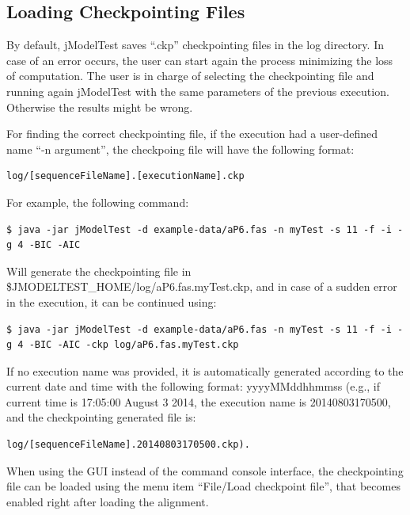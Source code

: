 \documentclass[10pt,twoside,a4paper]{article}
\begin{document}
\subsection{Loading Checkpointing Files}
\label{sec:ckp}

By default, jModelTest saves ``.ckp'' checkpointing files in the log directory. In case of an error occurs, the user can start again the process minimizing the loss of computation. The user is in charge of selecting the checkpointing file and running again jModelTest with the same parameters of the previous execution. Otherwise the results might be wrong.

For finding the correct checkpointing file, if the execution had a user-defined name ``-n argument'', the checkpoing file will have the following format: 

\begin{lstlisting}
log/[sequenceFileName].[executionName].ckp
\end{lstlisting}

For example, the following command:

\begin{lstlisting}
$ java -jar jModelTest -d example-data/aP6.fas -n myTest -s 11 -f -i -g 4 -BIC -AIC
\end{lstlisting}

Will generate the checkpointing file in \$JMODELTEST\_HOME/log/aP6.fas.myTest.ckp, and in case of a sudden error in the execution, it can be continued using:

\begin{lstlisting}
$ java -jar jModelTest -d example-data/aP6.fas -n myTest -s 11 -f -i -g 4 -BIC -AIC -ckp log/aP6.fas.myTest.ckp
\end{lstlisting}

If no execution name was provided, it is automatically generated according to the current date and time with the following format: yyyyMMddhhmmss (e.g., if current time is 17:05:00 August 3 2014, the execution name is 20140803170500, and the checkpointing generated file is:

\begin{lstlisting}
log/[sequenceFileName].20140803170500.ckp).
\end{lstlisting}

When using the GUI instead of the command console interface, the checkpointing file can be loaded using the menu item ``File/Load checkpoint file'', that becomes enabled right after loading the alignment.
\end{document}
